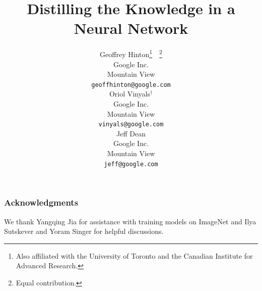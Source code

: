 \documentclass{article} %
\title{Distilling the Knowledge in a Neural Network}
\author{
Geoffrey Hinton\thanks{Also affiliated with the University of Toronto
  and the Canadian Institute for Advanced Research.}\ \ \thanks{Equal contribution.} \\
Google Inc.\\
Mountain View\\
\texttt{geoffhinton@google.com} \\
\And
Oriol Vinyals$^\dagger$\\
Google Inc.\\
Mountain View\\
\texttt{vinyals@google.com} \\
\And
Jeff Dean\\
Google Inc.\\
Mountain View\\
\texttt{jeff@google.com} \\
}
\begin{document}
\maketitle






 













\subsubsection*{Acknowledgments}

We thank Yangqing Jia for assistance with training models on ImageNet and Ilya
Sutskever and Yoram Singer for helpful discussions. 


\end{document}
